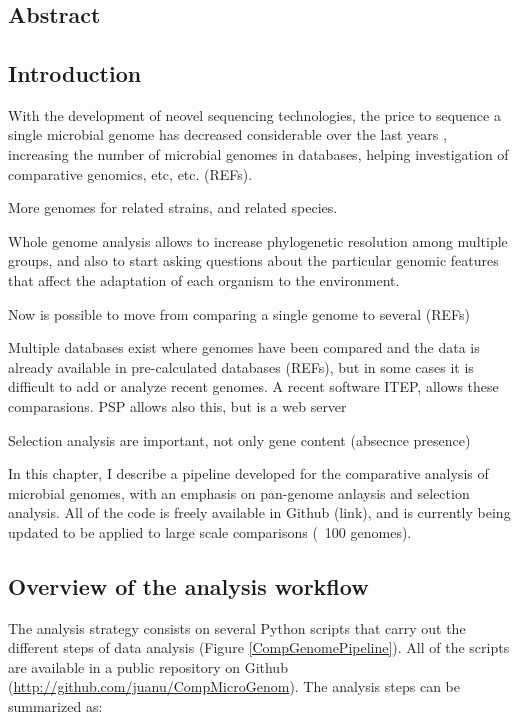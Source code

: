 \chapter{}

\section{Abstract}

\section{Introduction}

With the development of neovel sequencing technologies, the price to sequence a single microbial genome has decreased considerable over the last years \cite{Mardis:2013gn}, increasing the number of microbial genomes in databases, helping investigation of comparative genomics, etc, etc. (REFs). 

More genomes for related strains, and related species.

Whole genome analysis allows to increase phylogenetic resolution among multiple groups, and also to start asking questions about the particular genomic features that affect the adaptation of each organism to the environment.

Now is possible to move from comparing a single genome to several (REFs)

Multiple databases exist where genomes have been compared and the data is already available in pre-calculated databases (REFs), but in some cases it is difficult to add or analyze recent genomes. A recent software ITEP, allows these comparasions. PSP allows also this, but is a web server

Selection analysis are important, not only gene content (absecnce presence)

In this chapter, I describe a pipeline developed for the comparative analysis of microbial genomes, with an emphasis on pan-genome anlaysis and selection analysis. All of the code is freely available in Github (link), and is currently being updated to be applied to large scale comparisons (~100 genomes). 

\section{Overview of the analysis workflow}

The analysis strategy consists on several Python scripts that carry out the different steps of data analysis (Figure \ref{CompGenomePipeline}). All of the scripts are available in a public repository on Github (\url{http://github.com/juanu/CompMicroGenom}). The analysis steps can be summarized as:

